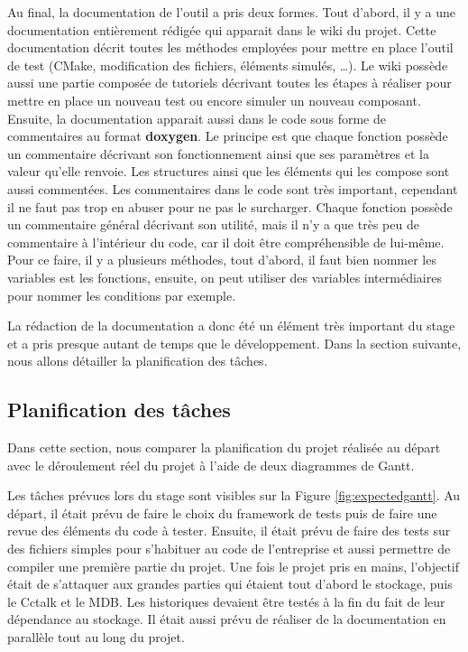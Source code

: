 \documentclass[a4paper]{article}
\begin{document}
Au final, la documentation de l'outil a pris deux formes. Tout d'abord, il y a
une documentation entièrement rédigée qui apparait dans le wiki du projet.
Cette documentation décrit toutes les méthodes employées pour mettre en place
l'outil de test (CMake, modification des fichiers, éléments simulés, \dots). Le
wiki possède aussi une partie composée de tutoriels décrivant toutes les étapes
à réaliser pour mettre en place un nouveau test ou encore simuler un nouveau
composant. Ensuite, la documentation apparait aussi dans le code sous forme de
commentaires au format \textbf{doxygen}. Le principe est que chaque fonction
possède un commentaire décrivant son fonctionnement ainsi que ses paramètres et
la valeur qu'elle renvoie. Les structures ainsi que les éléments qui les compose
sont aussi commentées. Les commentaires dans le code sont très important,
cependant il ne faut pas trop en abuser pour ne pas le surcharger. Chaque
fonction possède un commentaire général décrivant son utilité, mais il n'y a que
très peu de commentaire à l'intérieur du code, car il doit être compréhensible de
lui-même. Pour ce faire, il y a plusieurs méthodes, tout d'abord, il faut bien
nommer les variables est les fonctions, ensuite, on peut utiliser des variables
intermédiaires pour nommer les conditions par exemple.

La rédaction de la documentation a donc été un élément très important du stage
et a pris presque autant de temps que le développement. Dans la section
suivante, nous allons détailler la planification des tâches.

\clearpage
\subsection{Planification des tâches}%

Dans cette section, nous comparer la planification du projet réalisée au départ
avec le déroulement réel du projet à l'aide de deux diagrammes de Gantt.

Les tâches prévues lors du stage sont visibles sur la Figure
\ref{fig:expectedgantt}. Au départ, il était prévu de faire le choix du
framework de tests puis de faire une revue des éléments du code à tester.
Ensuite, il était prévu de faire des tests sur des fichiers simples pour
s'habituer au code de l'entreprise et aussi permettre de compiler une première
partie du projet. Une fois le projet pris en mains, l'objectif était de
s'attaquer aux grandes parties qui étaient tout d'abord le stockage, puis le
Cctalk et le MDB. Les historiques devaient être testés à la fin du fait de leur
dépendance au stockage. Il était aussi prévu de réaliser de la documentation en
parallèle tout au long du projet.
\end{document}

